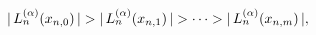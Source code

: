 $|\mathop{L^{(\alpha)}_{n}\/}\nolimits\!\left(x_{n,0}\right)|>|\mathop{L^{(%
\alpha)}_{n}\/}\nolimits\!\left(x_{n,1}\right)|>\cdots>|\mathop{L^{(\alpha)}_{%
n}\/}\nolimits\!\left(x_{n,m}\right)|,$